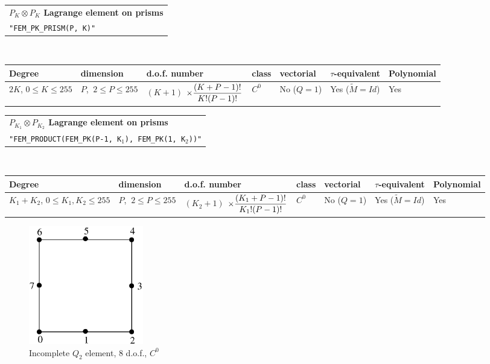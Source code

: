 \documentclass[11pt,a4paper]{article}
\begin{document}
\begin{center}
\begin{tabular}{|m{16.109cm}|} \hline 
{\bf $P_K \otimes P_K$ Lagrange element on prisms}\\
{\tt "FEM\_PK\_PRISM(P, K)"} 
\end{tabular} \\ \vspace{-1pt} 
\begin{tabular}{|m{2cm}|m{2cm}|m{2.5cm}|m{1.5cm}|m{1.5cm}|m{2cm}|m{2cm}|} \hline 
Degree & dimension & d.o.f. number & class & vectorial & \mbox{$\tau$-equivalent} & Polynomial\\ \hline
\small $2K$, \mbox{$0 \leq K \leq 255$} & \small $P$, \mbox{$\ 2 \leq P \leq 255$} & \mbox{$(K+1)$} \mbox{$\times {\displaystyle\frac{\displaystyle(K+P-1)!}{\displaystyle K! (P-1)!}}$} & $C^0$ & No \mbox{($Q = 1$)} & Yes \mbox{($\tilde{M} = Id$)}  & Yes\\ \hline
\end{tabular}
\end{center}

\begin{center}
\begin{tabular}{|m{16.109cm}|} \hline 
{\bf $P_{K_1} \otimes P_{K_2}$ Lagrange element on prisms}\\
{\tt "FEM\_PRODUCT(FEM\_PK(P-1, K$_1$), FEM\_PK(1, K$_2$))"} 
\end{tabular} \\ \vspace{-1pt} 
\begin{tabular}{|m{2cm}|m{2cm}|m{2.5cm}|m{1.5cm}|m{1.5cm}|m{2cm}|m{2cm}|} \hline 
Degree & dimension & d.o.f. number & class & vectorial & \mbox{$\tau$-equivalent} & Polynomial\\ \hline
\small \mbox{$K_1+K_2$}, \tiny \mbox{$0 \leq K_1,K_2 \leq 255$} & \small $P$, \mbox{$\ 2 \leq P \leq 255$} & \mbox{$(K_2+1)$} \mbox{$\times {\displaystyle\frac{\displaystyle(K_1+P-1)!}{\displaystyle K_1! (P-1)!}}$} & $C^0$ & No \mbox{($Q = 1$)} & Yes \mbox{($\tilde{M} = Id$)}  & Yes\\ \hline
\end{tabular}
\end{center}

\begin{figure}[H]
  \begin{center}
    \includegraphics[width=5cm,angle=0]{getfemlist_quad8.eps} \\
    Incomplete $Q_2$ element, 8 d.o.f., $C^0$  \\
  \end{center}
\end{figure}
\end{document}
